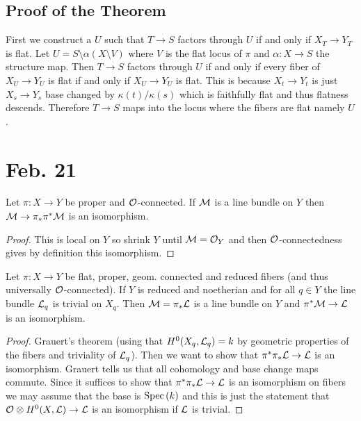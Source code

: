 \documentclass[12pt]{article}
\begin{document}
\subsection{Proof of the Theorem}

First we construct a $U$ such that $T \to S$ factors through $U$ if and only if $X_T \to Y_T$ is flat. Let $U = S \setminus \alpha(X \setminus V)$ where $V$ is the flat locus of $\pi$ and $\alpha : X \to S$ the structure map. Then $T \to S$ factors through $U$ if and only if every fiber of $X_U \to Y_U$ is flat if and only if $X_U \to Y_U$ is flat. This is because $X_t \to Y_t$ is just $X_s \to Y_s$ base changed by $\kappa(t) / \kappa(s)$ which is faithfully flat and thus flatness descends. Therefore $T \to S$ maps into the locus where the fibers are flat namely $U$.


\section{Feb. 21}

\begin{prop}
Let $\pi : X \to Y$ be proper and $\mathcal{O}_{}$-connected. If $\mathcal{M}$ is a line bundle on $Y$ then $\mathcal{M} \to \pi_* \pi^* \mathcal{M}$ is an isomorphism.
\end{prop}

\begin{proof}
This is local on $Y$ so shrink $Y$ until $\mathcal{M} = \mathcal{O}_{Y}$ and then $\mathcal{O}_{}$-connectedness gives by definition this isomorphism. 
\end{proof}

\begin{prop}
Let $\pi : X \to Y$ be flat, proper, geom. connected and reduced fibers (and thus universally $\mathcal{O}_{}$-connected). If $Y$ is reduced and noetherian and for all $q \in Y$ the line bundle $\mathcal{L}_q$ is trivial on $X_q$. Then $\mathcal{M} = \pi_* \mathcal{L}$ is a line bundle on $Y$ and $\pi^* \mathcal{M} \to \mathcal{L}$ is an isomorphism.
\end{prop}

\begin{proof}
Grauert's theorem (using that $H^0(X_q, \mathcal{L}_q) = k$ by geometric properties of the fibers and triviality of $\mathcal{L}_q$). Then we want to show that $\pi^* \pi_* \mathcal{L} \to \mathcal{L}$ is an isomorphism. Grauert tells us that all cohomology and base change maps commute. Since it suffices to show that $\pi^* \pi_* \mathcal{L} \to \mathcal{L}$ is an isomorphism on fibers we may assume that the base is $\mathrm{Spec}\left( k \right)$ and this is just the statement that $\mathcal{O}_{} \otimes H^0(X, \mathcal{L}) \to \mathcal{L}$ is an isomorphism if $\mathcal{L}$ is trivial.  
\end{proof}
\end{document}
